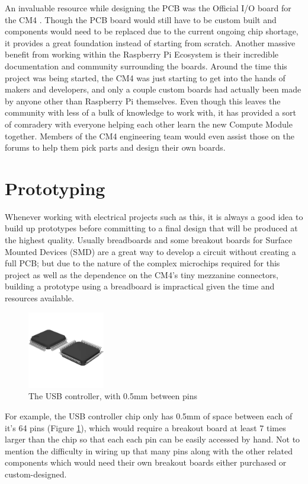 An invaluable resource while designing the PCB was the Official I/O board for the CM4 \cite{rpi_cm4_io}.
Though the PCB board would still have to be custom built and components would need to be replaced due to the current ongoing chip shortage, it provides a great foundation instead of starting from scratch.
Another massive benefit from working within the Raspberry Pi Ecosystem is their incredible documentation and community surrounding the boards.
Around the time this project was being started, the CM4 was just starting to get into the hands of makers and developers, and only a couple custom boards had actually been made by anyone other than Raspberry Pi themselves.
Even though this leaves the community with less of a bulk of knowledge to work with, it has provided a sort of comradery with everyone helping each other learn the new Compute Module together.
Members of the CM4 engineering team would even assist those on the forums to help them pick parts and design their own boards.


\section{Prototyping}\label{sec:Prototyping}

Whenever working with electrical projects such as this, it is always a good idea to build up prototypes before committing to a final design that will be produced at the highest quality.
Usually breadboards and some breakout boards for Surface Mounted Devices (SMD) are a great way to develop a circuit without creating a full PCB; but due to the nature of the complex microchips required for this project as well as the dependence on the CM4's tiny mezzanine connectors, building a prototype using a breadboard is impractical given the time and resources available.
\begin{figure}
  \centering
  \includegraphics[width=0.3\textwidth]{Figures/64-LQFP}
  \caption[USB Controller]{The USB controller, with 0.5mm between pins}
  \label{fig:USBController}
\end{figure}
For example, the USB controller chip only has 0.5mm of space between each of it's 64 pins (Figure \ref{fig:USBController}), which would require a breakout board at least 7 times larger than the chip so that each each pin can be easily accessed by hand.
Not to mention the difficulty in wiring up that many pins along with the other related components which would need their own breakout boards either purchased or custom-designed.

